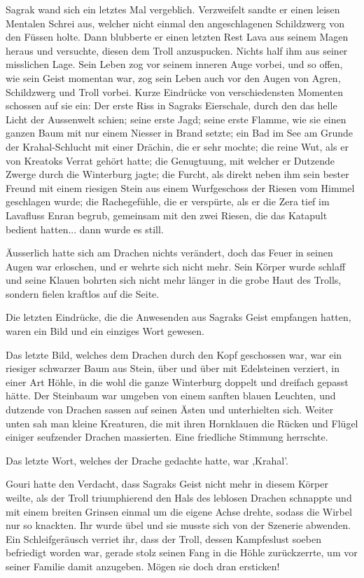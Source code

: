 \documentclass[10pt, a4paper, oneside]{book}
\begin{document}
Sagrak wand sich ein letztes Mal vergeblich. Verzweifelt sandte er einen leisen Mentalen Schrei aus, welcher nicht einmal den angeschlagenen Schildzwerg von den Füssen holte. Dann blubberte er einen letzten Rest Lava aus seinem Magen heraus und versuchte, diesen dem Troll anzuspucken. Nichts half ihm aus seiner misslichen Lage. Sein Leben zog vor seinem inneren Auge vorbei, und so offen, wie sein Geist momentan war, zog sein Leben auch vor den Augen von Agren, Schildzwerg und Troll vorbei. Kurze Eindrücke von verschiedensten Momenten schossen auf sie ein: Der erste Riss in Sagraks Eierschale, durch den das helle Licht der Aussenwelt schien; seine erste Jagd; seine erste Flamme, wie sie einen ganzen Baum mit nur einem Niesser in Brand setzte; ein Bad im See am Grunde der Krahal-Schlucht mit einer Drächin, die er sehr mochte; die reine Wut, als er von Kreatoks Verrat gehört hatte; die Genugtuung, mit welcher er Dutzende Zwerge durch die Winterburg jagte; die Furcht, als direkt neben ihm sein bester Freund mit einem riesigen Stein aus einem Wurfgeschoss der Riesen vom Himmel geschlagen wurde; die Rachegefühle, die er verspürte, als er die Zera tief im Lavafluss Enran begrub, gemeinsam mit den zwei Riesen, die das Katapult bedient hatten... dann wurde es still.

Äusserlich hatte sich am Drachen nichts verändert, doch das Feuer in seinen Augen war erloschen, und er wehrte sich nicht mehr. Sein Körper wurde schlaff und seine Klauen bohrten sich nicht mehr länger in die grobe Haut des Trolls, sondern fielen kraftlos auf die Seite.

Die letzten Eindrücke, die die Anwesenden aus Sagraks Geist empfangen hatten, waren ein Bild und ein einziges Wort gewesen.

Das letzte Bild, welches dem Drachen durch den Kopf geschossen war, war ein riesiger schwarzer Baum aus Stein, über und über mit Edelsteinen verziert, in einer Art Höhle, in die wohl die ganze Winterburg doppelt und dreifach gepasst hätte. Der Steinbaum war umgeben von einem sanften blauen Leuchten, und dutzende von Drachen sassen auf seinen Ästen und unterhielten sich. Weiter unten sah man kleine Kreaturen, die mit ihren Hornklauen die Rücken und Flügel einiger seufzender Drachen massierten. Eine friedliche Stimmung herrschte.

Das letzte Wort, welches der Drache gedachte hatte, war ‚Krahal’.

Gouri hatte den Verdacht, dass Sagraks Geist nicht mehr in diesem Körper weilte, als der Troll triumphierend den Hals des leblosen Drachen schnappte und mit einem breiten Grinsen einmal um die eigene Achse drehte, sodass die Wirbel nur so knackten. Ihr wurde übel und sie musste sich von der Szenerie abwenden. Ein Schleifgeräusch verriet ihr, dass der Troll, dessen Kampfeslust soeben befriedigt worden war, gerade stolz seinen Fang in die Höhle zurückzerrte, um vor seiner Familie damit anzugeben. Mögen sie doch dran ersticken!
\end{document}
